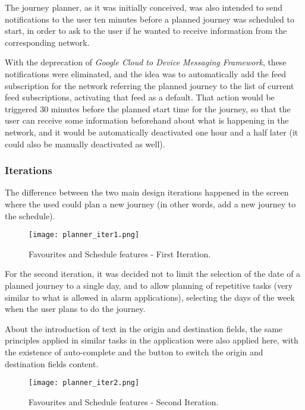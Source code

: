 The journey planner, as it was initially conceived, was also intended to send notifications to the user ten minutes before a planned journey was scheduled to start, in order to ask to the user if he wanted to receive information from the corresponding network. 

With the deprecation of \emph{Google Cloud to Device Messaging Framework}, these notifications were eliminated, and the idea was to automatically add the feed subscription for the network referring the planned journey to the list of current feed subscriptions, activating that feed as a default. That action would be triggered 30 minutes before the planned start time for the journey, so that the user can receive some information beforehand about what is happening in the network, and it would be automatically deactivated one hour and a half later (it could also be manually deactivated as well).

\subsubsection{Iterations}

The difference between the two main design iterations happened in the screen where the used could plan a new journey (in other words, add a new journey to the schedule).

\begin{figure}[h!]
  \begin{center}
    \leavevmode
    \texttt{[image: planner\_iter1.png]}
    \caption{Favourites and Schedule features - First Iteration.}
    \label{fig:planner_iter1}
  \end{center}
\end{figure}

For the second iteration, it was decided not to limit the selection of the date of a planned journey to a single day, and to allow planning of repetitive tasks (very similar to what is allowed in alarm applications), selecting the days of the week when the user plans to do the journey.

About the introduction of text in the origin and destination fields, the same principles applied in similar tasks in the application were also applied here, with the existence of auto-complete and the button to switch the origin and destination fields content.

\begin{figure}[h!]
  \begin{center}
    \leavevmode
    \texttt{[image: planner\_iter2.png]}
    \caption{Favourites and Schedule features - Second Iteration.}
    \label{fig:planner_iter2}
  \end{center}
\end{figure}

